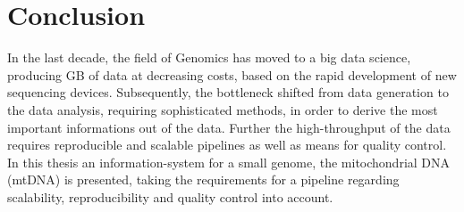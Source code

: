 \chapter{Conclusion}
\label{chap:conclusion}

In the last decade, the  field of Genomics has moved to a big data science, producing GB of data at decreasing costs, based on the rapid development of new sequencing devices. Subsequently, the bottleneck shifted from data generation to the data analysis, requiring sophisticated methods, in order to derive the most important informations out of the data. Further the high-throughput of the data requires reproducible and scalable pipelines as well as means for quality control. In this thesis an information-system for a small genome, the mitochondrial DNA (mtDNA) is presented, taking the requirements for a pipeline regarding scalability, reproducibility and quality control into account. 

